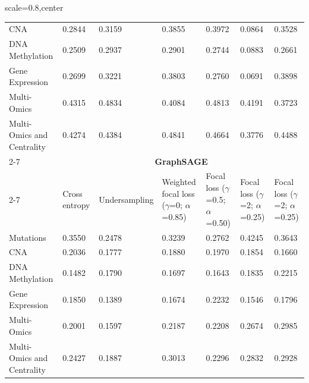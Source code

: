 \documentclass[ppgc, diss, english]{iiufrgs}
\begin{document}
\begin{landscape}
\begin{table}[!th]
\begin{adjustbox}{scale=0.8,center}
\begin{tabular}{lllllll}
CNA                        & 0.2844        & 0.3159        & 0.3855                            & 0.3972                     & 0.0864                   & 0.3528                   \\
DNA Methylation            & 0.2509        & 0.2937        & 0.2901                            & 0.2744                     & 0.0883                   & 0.2661                   \\
Gene Expression            & 0.2699        & 0.3221        & 0.3803                            & 0.2760                     & 0.0691                   & 0.3898                   \\
Multi-Omics                & 0.4315        & 0.4834        & 0.4084                            & 0.4813                     & 0.4191                   & 0.3723                   \\
Multi-Omics and Centrality & 0.4274        & 0.4384        & 0.4841                            & 0.4664                     & 0.3776                   & 0.4488                   \\ \cline{2-7}
                           & \multicolumn{6}{c}{\textbf{GraphSAGE}}                                                                                                                        \\ \cline{2-7}
                           & Cross entropy & Undersampling & Weighted focal loss ($\gamma$=0; $\alpha$=0.85) & Focal loss ($\gamma$=0.5; $\alpha$=0.50) & Focal loss ($\gamma$=2; $\alpha$=0.25) & Focal loss ($\gamma$=2; $\alpha$=0.25) \\
Mutations                  & 0.3550        & 0.2478        & 0.3239                            & 0.2762                     & 0.4245                   & 0.3643                   \\
CNA                        & 0.2036        & 0.1777        & 0.1880                            & 0.1970                     & 0.1854                   & 0.1660                   \\
DNA Methylation            & 0.1482        & 0.1790        & 0.1697                            & 0.1643                     & 0.1835                   & 0.2215                   \\
Gene Expression            & 0.1850        & 0.1389        & 0.1674                            & 0.2232                     & 0.1546                   & 0.1796                   \\
Multi-Omics                & 0.2001        & 0.1597        & 0.2187                            & 0.2208                     & 0.2674                   & 0.2985                   \\
Multi-Omics and Centrality & 0.2427        & 0.1887        & 0.3013                            & 0.2296                     & 0.2832                   & 0.2928                   \\ \hline
\end{tabular}


\end{adjustbox}
\end{table}
\end{landscape}
\end{document}
